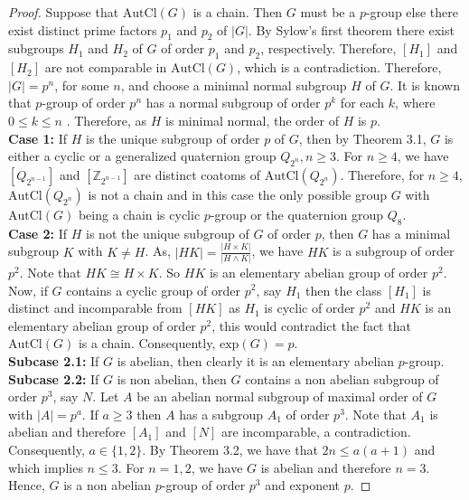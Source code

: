 \documentclass{article}
\theoremstyle{definition}
\begin{document}
\begin{proof} Suppose that $\text{AutCl}(G)$ is a chain. Then $G$ must be a $p$-group else there exist distinct prime factors $p_1$ and $p_2$ of $|G|$. By Sylow's first theorem there exist subgroups $H_1$ and $H_2$ of $G$ of order $p_1$ and $p_2$, respectively. Therefore, $[H_1]$ and $[H_2]$ are not comparable in $\text{AutCl}(G)$, which is a contradiction. Therefore, $|G|=p^n$, for some $n$, and choose a minimal normal subgroup $H$ of $G$. It is known that $p$-group of order $p^n$ has a normal subgroup of order $p^k$ for each $k$, where $0\le k\le n$ \cite{Dummit_Foote_}. Therefore, as $H$ is minimal normal, the order of $H$ is $p$. \vspace{0.2cm} \\
\textbf{Case 1:} If $H$ is the unique subgroup of order $p$ of $G$, then by Theorem 3.1, $G$ is either a cyclic or a generalized quaternion group $Q_{2^n}, n\ge 3.$ For $n\ge 4$, we have $[Q_{2^{n-1}}]$ and $[\mathbb{Z}_{2^{n-1}}]$ are distinct coatoms of $\text{AutCl}(Q_{2^n})$. Therefore, for $n\ge 4$, $\text{AutCl}(Q_{2^n})$ is not a chain and in this case the only possible group $G$ with $\text{AutCl}(G)$ being a chain is cyclic $p$-group or the quaternion group $Q_8$. \vspace{0.2cm}\\
\textbf{Case 2:} If $H$ is not the unique subgroup of $G$ of order $p$, then $G$ has a minimal subgroup $K$ with $K\ne H$. As, $|HK|=\frac{|H \times K|}{|H\wedge K|}$, we have $HK$ is a subgroup of order $p^2$. Note that $HK\cong H\times K$. So $HK$ is an elementary abelian group of order $p^2$. Now, if $G$ contains a cyclic group of order $p^2$, say $H_1$ then the class $[H_1]$ is distinct and incomparable from $[HK]$ as $H_1$ is cyclic of order $p^2$ and $HK$ is an elementary abelian group of order $p^2$, this would contradict the fact that $\text{AutCl}(G)$ is a chain. Consequently, $\text{exp}(G)=p$. \vspace{0.2cm}\\
\textbf{Subcase 2.1:} If $G$ is abelian, then clearly it is an elementary abelian $p$-group. \vspace{0.2cm}\\
\textbf{Subcase 2.2:} If $G$ is non abelian, then $G$ contains a non abelian subgroup of order $p^3$, say $N$. Let $A$ be an abelian normal subgroup of maximal order of $G$ with $|A|=p^a$. If $a\ge 3$ then $A$ has a subgroup $A_1$ of order $p^3$. Note that $A_1$ is abelian and therefore $[A_1]$ and $[N]$ are incomparable, a contradiction. Consequently, $a\in \{1,2\}$. By Theorem 3.2, we have that $2n\le a(a+1)$ and which implies $n\le 3$. For $n=1,2$, we have $G$ is abelian and therefore $n=3$. Hence, $G$ is a non abelian $p$-group of order $p^3$ and exponent $p$.\par

\end{proof}
\end{document}
